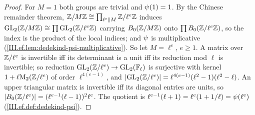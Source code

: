 \begin{lemma}
\end{lemma}
\begin{proof}
For $M=1$ both groups are trivial and $\psi(1)=1$. By the Chinese remainder theorem, $\mathbb{Z}/M\mathbb{Z}\cong\prod_{\ell^e\parallel M}\mathbb{Z}/\ell^e\mathbb{Z}$ induces
$\mathrm{GL}_2(\mathbb{Z}/M\mathbb{Z})\cong\prod\mathrm{GL}_2(\mathbb{Z}/\ell^e\mathbb{Z})$ carrying $B_0(\mathbb{Z}/M\mathbb{Z})$ onto $\prod B_0(\mathbb{Z}/\ell^e\mathbb{Z})$, so the index is the product of the local indices; and
$\psi$ is multiplicative (\cref{III.ef.lem:dedekind-psi-multiplicative}). So let $M=\ell^e$, $e\ge1$. A matrix over $\mathbb{Z}/\ell^e$ is invertible iff its
determinant is a unit iff its reduction mod $\ell$ is invertible; so reduction $\mathrm{GL}_2(\mathbb{Z}/\ell^e)\to\mathrm{GL}_2(\mathbb F_\ell)$ is surjective with kernel
$1+\ell\mathrm{M}_2(\mathbb{Z}/\ell^e)$ of order $\ell^{4(e-1)}$, and $\lvert\mathrm{GL}_2(\mathbb{Z}/\ell^e)\rvert=\ell^{4(e-1)}(\ell^2-1)(\ell^2-\ell)$. An upper triangular matrix is invertible
iff its diagonal entries are units, so $\lvert B_0(\mathbb{Z}/\ell^e)\rvert=(\ell^{e-1}(\ell-1))^2\ell^e$. The quotient is $\ell^{e-1}(\ell+1)=\ell^e(1+1/\ell)=\psi(\ell^e)$
(\cref{III.ef.def:dedekind-psi}).
\end{proof}

